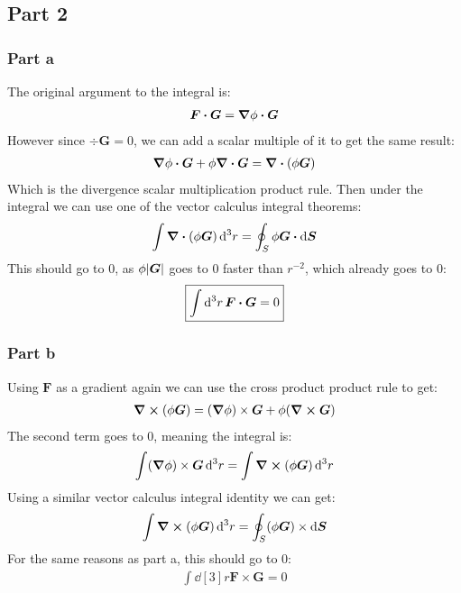 \documentclass[12pt]{article}
\renewcommand{\vb}[1]{\bm{#1}}
\begin{document}
\subsection*{Part 2}
\subsubsection*{Part a}
The original argument to the integral is:
\begin{align*}
  \vb{F}\vdot\vb{G}=\grad{\phi}\vdot\vb{G}
\end{align*}
However since $\div{\vb{G}}=0$, we can add a scalar multiple of it to get the same result:
\begin{align*}
  \grad{\phi}\vdot\vb{G}+\phi\div{\vb{G}}=\div{(\phi\vb{G})}
\end{align*}
Which is the divergence scalar multiplication product rule. Then under the integral we can use one of the vector calculus integral theorems:
\begin{align*}
  \int\div{(\phi\vb{G})}\dd[3]{r}=\oint_S\phi\vb{G}\vdot\dd{\vb{S}}
\end{align*}
This should go to $0$, as $\phi\abs{\vb{G}}$ goes to $0$ faster than $r^{-2}$, which already goes to $0$:
\begin{align}
  \boxed{\int\dd[3]{r}\vb{F}\vdot\vb{G}=0}
\end{align}
\subsubsection*{Part b}
Using $\vb{F}$ as a gradient again we can use the cross product product rule to get:
\begin{align*}
  \curl{(\phi\vb{G})}=(\grad{\phi})\times\vb{G}+\phi(\curl{\vb{G}})
\end{align*}
The second term goes to $0$, meaning the integral is:
\begin{align*}
  \int(\grad{\phi})\times\vb{G}\dd[3]{r}=\int\curl{(\phi\vb{G})}\dd[3]{r}
\end{align*}
Using a similar vector calculus integral identity we can get:
\begin{align*}
  \int\curl{(\phi\vb{G})}\dd[3]{r}=\oint_S(\phi\vb{G})\times\dd{\vb{S}}
\end{align*}
For the same reasons as part a, this should go to $0$:
\begin{align}
  \boxed{\int\dd[3]{r}\vb{F}\times\vb{G}=0}
\end{align}
\end{document}
